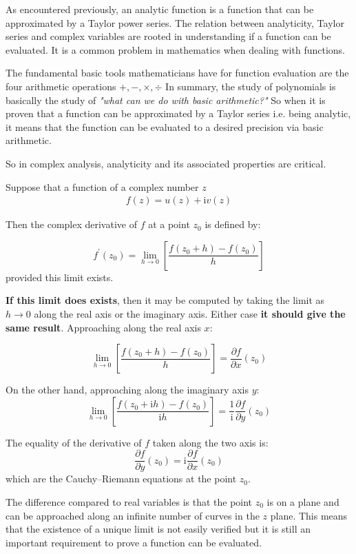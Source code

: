 \documentclass[10pt,a4paper]{article}
\begin{document}
As encountered previously, an analytic function is a function that can be approximated by a Taylor
power series. The relation between analyticity, Taylor series and complex variables are rooted in
understanding if a function can be evaluated. It is a common problem in mathematics when dealing
with functions. 

The fundamental basic tools mathematicians have for function evaluation are the four arithmetic
operations $+,-,\times,\div$ In summary, the study of polynomials is basically the study of
\textit{ "what can we do with basic arithmetic?"} So when it is proven that a function can be
approximated by a Taylor series i.e. being analytic, it means that the function can be evaluated to
a desired precision via basic arithmetic.

So in complex analysis, analyticity and its associated properties are critical.

Suppose that a function of a complex number $z$
\begin{align*}
    f(z) = u(z) + \text{i} v(z)
\end{align*}

Then the complex derivative of $f$ at a point $z_0$ is defined by:

$$f^{\prime}(z_0)=\lim_{h\rightarrow 0}\left[\frac{f(z_0 + h)-f(z_0)}{h}\right]$$
provided this limit exists. 

\textbf{If this limit does exists}, then it may be computed by taking the limit as $h \rightarrow 0$ along
the real axis or the imaginary axis. Either case \textbf{it should give the same result}. Approaching along
the real axis $x$:  

$$\lim_{h\rightarrow 0}\left[\frac{f(z_0 + h)-f(z_0)}{h}\right]=\frac{\partial f}{\partial x}(z_0)$$

On the other hand, approaching along the imaginary axis $y$:
$$\lim_{h\rightarrow 0}\left[\frac{f(z_0 +
\text{i}h)-f(z_0)}{\text{i}h}\right]=\frac{1}{\text{i}}\frac{\partial f}{\partial y}(z_0)$$

The equality of the derivative of $f$ taken along the two axis is:
$$\frac{\partial f}{\partial y}(z_0)=\text{i}\frac{\partial f}{\partial x}(z_0)$$
which are the Cauchy–Riemann equations at the point $z_0$.

The difference compared to real variables is that the point $z_0$ is on a plane and can be approached along an
infinite number of curves in the $z$ plane. This means that the existence of a unique limit is not easily
verified but it is still an important requirement to prove a function can be evaluated.
\end{document}
